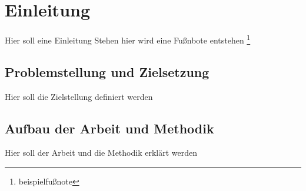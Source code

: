 

\lstset{language=C}

\chapter{Einleitung}

Hier soll eine Einleitung Stehen hier wird eine Fußnbote entstehen \footnote{beispielfußnote}





\section{Problemstellung und Zielsetzung}
\label{sec:semant-textauszeichnung}

Hier soll die Zielstellung definiert werden

\section{Aufbau der Arbeit und Methodik}

Hier soll der Arbeit und die Methodik erklärt werden









